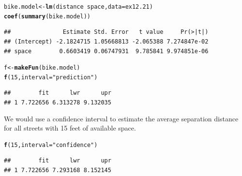 \documentclass[twoside]{book}
\makeatletter
\newcommand{\hlnum}[1]{\textcolor[rgb]{0.686,0.059,0.569}{#1}}%
\newcommand{\hlstr}[1]{\textcolor[rgb]{0.192,0.494,0.8}{#1}}%
\newcommand{\hlopt}[1]{\textcolor[rgb]{0,0,0}{#1}}%
\newcommand{\hlstd}[1]{\textcolor[rgb]{0.345,0.345,0.345}{#1}}%
\newcommand{\hlkwb}[1]{\textcolor[rgb]{0.69,0.353,0.396}{#1}}%
\newcommand{\hlkwc}[1]{\textcolor[rgb]{0.333,0.667,0.333}{#1}}%
\newcommand{\hlkwd}[1]{\textcolor[rgb]{0.737,0.353,0.396}{\textbf{#1}}}%
\newenvironment{kframe}{%
 \def\at@end@of@kframe{}%
 \ifinner\ifhmode%
  \def\at@end@of@kframe{\end{minipage}}%
  \begin{minipage}{\columnwidth}%
 \fi\fi%
 \def\FrameCommand##1{\hskip\@totalleftmargin \hskip-\fboxsep
 \colorbox{shadecolor}{##1}\hskip-\fboxsep
     \hskip-\linewidth \hskip-\@totalleftmargin \hskip\columnwidth}%
 \MakeFramed {\advance\hsize-\width
   \@totalleftmargin\z@ \linewidth\hsize
   \@setminipage}}%
 {\par\unskip\endMakeFramed%
 \at@end@of@kframe}
\newenvironment{knitrout}{}{} %
\makeatother
\begin{document}
\begin{solution}
\begin{knitrout}
\color{fgcolor}\begin{kframe}
\begin{alltt}
\hlstd{bike.model} \hlkwb{<-} \hlkwd{lm}\hlstd{(distance} \hlopt{~} \hlstd{space,} \hlkwc{data} \hlstd{= ex12.21)}
\hlkwd{coef}\hlstd{(}\hlkwd{summary}\hlstd{(bike.model))}
\end{alltt}
\begin{verbatim}
##               Estimate Std. Error   t value     Pr(>|t|)
## (Intercept) -2.1824715 1.05668813 -2.065388 7.274847e-02
## space        0.6603419 0.06747931  9.785841 9.974851e-06
\end{verbatim}
\begin{alltt}
\hlstd{f} \hlkwb{<-} \hlkwd{makeFun}\hlstd{(bike.model)}
\hlkwd{f}\hlstd{(}\hlnum{15}\hlstd{,} \hlkwc{interval} \hlstd{=} \hlstr{"prediction"}\hlstd{)}
\end{alltt}
\begin{verbatim}
##        fit      lwr      upr
## 1 7.722656 6.313278 9.132035
\end{verbatim}
\end{kframe}
\end{knitrout}
We would use a confidence interval to estimate the average separation distance 
for all streets with 15 feet of available space.
\begin{knitrout}
\color{fgcolor}\begin{kframe}
\begin{alltt}
\hlkwd{f}\hlstd{(}\hlnum{15}\hlstd{,} \hlkwc{interval} \hlstd{=} \hlstr{"confidence"}\hlstd{)}
\end{alltt}
\begin{verbatim}
##        fit      lwr      upr
## 1 7.722656 7.293168 8.152145
\end{verbatim}
\end{kframe}
\end{knitrout}
\end{solution}
\end{document}
